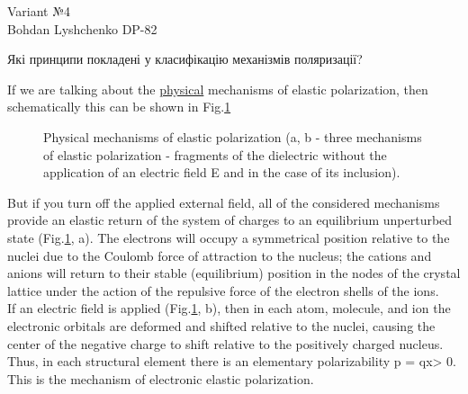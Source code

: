 \documentclass[a4paper,14pt]{extreport}
\begin{document}
\pagecolor{white}


\begin{center}
Variant №4\\
\vspace{0.5cm}
Bohdan Lyshchenko DP-82
\end{center}

\begin{center}
Які принципи покладені у класифікацію механізмів поляризації?
\end{center}
\vspace{1cm}



If we are talking about the \underline{physical} mechanisms of elastic polarization, then schematically this can be shown in Fig.\ref{ris1}

\begin{figure}[h]
\caption{Physical mechanisms of elastic polarization (a, b - three mechanisms of elastic polarization - fragments of the dielectric without the application of an electric field E and in the case of its inclusion).}
\label{ris1}
\end{figure}

But if you turn off the applied external field, all of the considered mechanisms provide an elastic return of the system of charges to an equilibrium unperturbed state (Fig.\ref{ris1}, a). The electrons will occupy a symmetrical position relative to the nuclei due to the Coulomb force of attraction to the nucleus; the cations and anions will return to their stable (equilibrium) position in the nodes of the crystal lattice under the action of the repulsive force of the electron shells of the ions. \\

If an electric field is applied (Fig.\ref{ris1}, b), then in each atom, molecule, and ion the electronic orbitals are deformed and shifted relative to the nuclei, causing the center of the negative charge to shift relative to the positively charged nucleus. Thus, in each structural element there is an elementary polarizability p = qx> 0. This is the mechanism of electronic elastic polarization.
\end{document}
